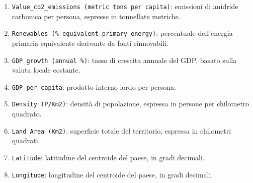 \begin{enumerate}
    \item \texttt{Value\_co2\_emissions (metric tons per capita)}: emissioni di anidride carbonica per persona, espresse in tonnellate metriche.
    \item \texttt{Renewables (\% equivalent primary energy)}: percentuale dell'energia primaria equivalente derivante da fonti rinnovabili.
    \item \texttt{GDP growth (annual \%)}: tasso di crescita annuale del GDP, basato sulla valuta locale costante.
    \item \texttt{GDP per capita}: prodotto interno lordo per persona.
    \item \texttt{Density (P/Km2)}: densità di popolazione, espressa in persone per chilometro quadrato.
    \item \texttt{Land Area (Km2)}: superficie totale del territorio, espressa in chilometri quadrati.
    \item \texttt{Latitude}: latitudine del centroide del paese, in gradi decimali.
    \item \texttt{Longitude}: longitudine del centroide del paese, in gradi decimali.
\end{enumerate}

